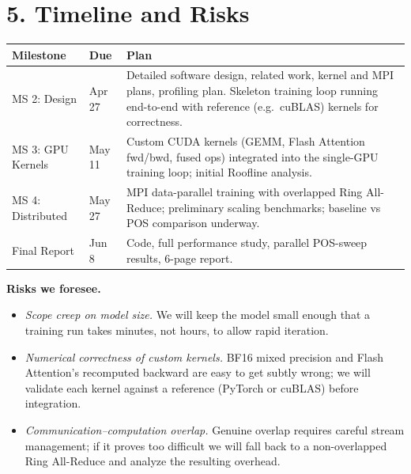 \documentclass[11pt]{article}
\begin{document}
\section*{5. Timeline and Risks}

\begin{center}
\begin{tabular}{@{}llp{9.5cm}@{}}
\toprule
\textbf{Milestone} & \textbf{Due} & \textbf{Plan} \\
\midrule
MS 2: Design        & Apr 27 & Detailed software design, related work, kernel and MPI plans, profiling plan. Skeleton training loop running end-to-end with reference (e.g.\ cuBLAS) kernels for correctness. \\
MS 3: GPU Kernels   & May 11 & Custom CUDA kernels (GEMM, Flash Attention fwd/bwd, fused ops) integrated into the single-GPU training loop; initial Roofline analysis. \\
MS 4: Distributed   & May 27 & MPI data-parallel training with overlapped Ring All-Reduce; preliminary scaling benchmarks; baseline vs POS comparison underway. \\
Final Report        & Jun 8  & Code, full performance study, parallel POS-sweep results, 6-page report. \\
\bottomrule
\end{tabular}
\end{center}

\textbf{Risks we foresee.}
\begin{itemize}
    \item \emph{Scope creep on model size.} We will keep the model small enough that a training run takes minutes, not hours, to allow rapid iteration.
    \item \emph{Numerical correctness of custom kernels.} BF16 mixed precision and Flash Attention's recomputed backward are easy to get subtly wrong; we will validate each kernel against a reference (PyTorch or cuBLAS) before integration.
    \item \emph{Communication--computation overlap.} Genuine overlap requires careful stream management; if it proves too difficult we will fall back to a non-overlapped Ring All-Reduce and analyze the resulting overhead.
\end{itemize}
\end{document}
